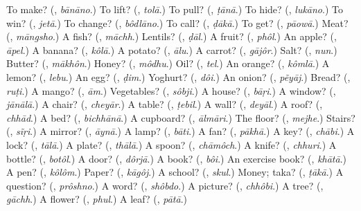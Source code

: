 \begin{tcolorbox}[breakable,colback=teal!4,colframe=teal!35!black,title={Before you move on}]
To make? (\textbf{}, \emph{bānāno}.) To lift? (\textbf{}, \emph{tolā}.) To pull? (\textbf{}, \emph{ṭānā}.) To hide? (\textbf{}, \emph{lukāno}.) To win? (\textbf{}, \emph{jetā}.) To change? (\textbf{}, \emph{bôdlāno}.) To call? (\textbf{}, \emph{ḍākā}.) To get? (\textbf{}, \emph{pāowā}.) Meat? (\textbf{}, \emph{māngsho}.) A fish? (\textbf{}, \emph{māchh}.) Lentils? (\textbf{}, \emph{ḍāl}.) A fruit? (\textbf{}, \emph{phôl}.) An apple? (\textbf{}, \emph{āpel}.) A banana? (\textbf{}, \emph{kôlā}.) A potato? (\textbf{}, \emph{ālu}.) A carrot? (\textbf{}, \emph{gājôr}.) Salt? (\textbf{}, \emph{nun}.) Butter? (\textbf{}, \emph{mākhôn}.) Honey? (\textbf{}, \emph{môdhu}.) Oil? (\textbf{}, \emph{tel}.) An orange? (\textbf{}, \emph{kômlā}.) A lemon? (\textbf{}, \emph{lebu}.) An egg? (\textbf{}, \emph{ḍim}.) Yoghurt? (\textbf{}, \emph{dôi}.) An onion? (\textbf{}, \emph{pẽyāj}.) Bread? (\textbf{}, \emph{ruṭi}.) A mango? (\textbf{}, \emph{ām}.) Vegetables? (\textbf{}, \emph{sôbji}.) A house? (\textbf{}, \emph{bāṛi}.) A window? (\textbf{}, \emph{jānālā}.) A chair? (\textbf{}, \emph{cheyār}.) A table? (\textbf{}, \emph{ṭebil}.) A wall? (\textbf{}, \emph{deyāl}.) A roof? (\textbf{}, \emph{chhād}.) A bed? (\textbf{}, \emph{bichhānā}.) A cupboard? (\textbf{}, \emph{ālmāri}.) The floor? (\textbf{}, \emph{mejhe}.) Stairs? (\textbf{}, \emph{sĩṛi}.) A mirror? (\textbf{}, \emph{āynā}.) A lamp? (\textbf{}, \emph{bāti}.) A fan? (\textbf{}, \emph{pākhā}.) A key? (\textbf{}, \emph{chābi}.) A lock? (\textbf{}, \emph{tālā}.) A plate? (\textbf{}, \emph{thālā}.) A spoon? (\textbf{}, \emph{chāmôch}.) A knife? (\textbf{}, \emph{chhuri}.) A bottle? (\textbf{}, \emph{botôl}.) A door? (\textbf{}, \emph{dôrjā}.) A book? (\textbf{}, \emph{bôi}.) An exercise book? (\textbf{}, \emph{khātā}.) A pen? (\textbf{}, \emph{kôlôm}.) Paper? (\textbf{}, \emph{kāgôj}.) A school? (\textbf{}, \emph{skul}.) Money; taka? (\textbf{}, \emph{ṭākā}.) A question? (\textbf{}, \emph{prôshno}.) A word? (\textbf{}, \emph{shôbdo}.) A picture? (\textbf{}, \emph{chhôbi}.) A tree? (\textbf{}, \emph{gāchh}.) A flower? (\textbf{}, \emph{phul}.) A leaf? (\textbf{}, \emph{pātā}.)
\end{tcolorbox}

